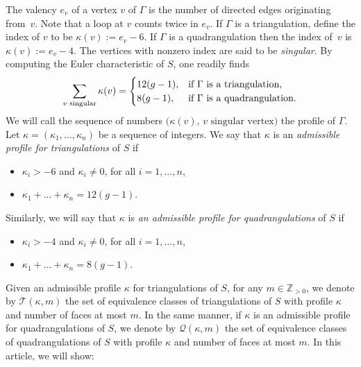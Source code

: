 \documentclass[10pt]{amsart}
\theoremstyle{plain}
\theoremstyle{definition}
\newcommand\Z{\mathbb{Z}}
\newcommand{\QQ}{\mathscr{Q}}
\newcommand{\TT}{\mathscr{T}}
\let\G\Gamma
\providecommand{\skpt}{\par\smallskip\noindent}
\begin{document}
The valency $e_v$ of a vertex $v$ of $\G$ is the number of directed edges originating from~$v$. Note that a loop at $v$ counts twice in $e_v$. If $\G$ is a triangulation, define the index of $v$ to be $\kappa(v):=e_v-6$. If $\G$ is a quadrangulation then the index of~$v$ is $\kappa(v):=e_v-4$. The vertices with nonzero index are said to be \emph{singular}. By computing the Euler characteristic of $S$, one readily finds
\begin{equation}\label{eq:euler:char}
\sum_{v\text{ singular}}\kappa(v)=
\begin{cases}
12(g-1), & \hbox{if $\G$ is a triangulation}, \\
8(g-1), & \hbox{if $\G$ is a quadrangulation}.
\end{cases}
\end{equation}
We will call the sequence of numbers $\bigl(\kappa(v), \, v \textrm{ singular vertex}\bigr)$ the profile of $\G$.
Let $\kappa=(\kappa_1,\dots,\kappa_n)$ be a sequence of integers.
We say that $\kappa$ is an \emph{admissible profile for triangulations} of $S$ if
\begin{itemize}\renewcommand{\labelitemi}{$\scriptstyle\bullet$}
\item
$\kappa_i>-6$ and $\kappa_i\neq 0$, for all $i=1,\dots,n$,
\item
$\kappa_1+\dots+\kappa_n=12(g-1)$.
\end{itemize}
Similarly, we will say that $\kappa$ is \emph{an admissible profile for quadrangulations} of $S$ if
\begin{itemize}\renewcommand{\labelitemi}{$\scriptstyle\bullet$}
\item
$\kappa_i>-4$ and $\kappa_i\neq 0$, for all $i=1,\dots,n$,
\item
$\kappa_1+\dots+\kappa_n=8(g-1)$.
\end{itemize}

Given an admissible profile $\kappa$ for triangulations of $S$, for any $m\in \Z_{>0}$, we denote by $\TT(\kappa,m)$ the set of equivalence classes of triangulations of $S$ with profile $\kappa$ and number of faces at most $m$. In the same manner, if $\kappa$ is an admissible profile for quadrangulations of $S$, we denote by $\QQ(\kappa,m)$ the set of equivalence classes of quadrangulations of $S$ with profile $\kappa$ and number of faces at most $m$.
In this article, we will show:

\skpt
\end{document}
